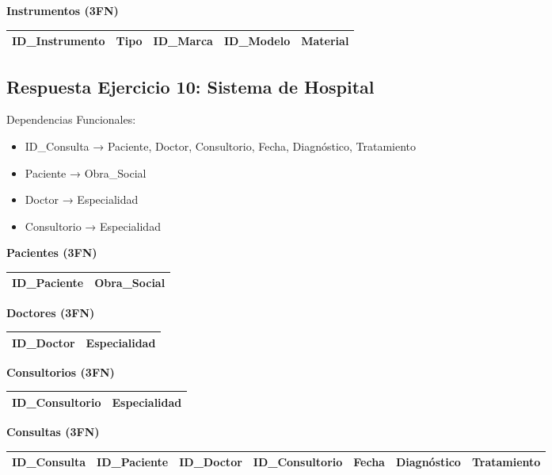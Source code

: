 \documentclass[12pt]{article}
\begin{document}
\textbf{Instrumentos (3FN)}
\begin{center}
\begin{tabular}{|l|l|l|l|l|}
\hline
ID\_Instrumento & Tipo & ID\_Marca & ID\_Modelo & Material \\
\hline
\end{tabular}
\end{center}

\subsection{Respuesta Ejercicio 10: Sistema de Hospital}

Dependencias Funcionales:
\begin{itemize}
    \item ID\_Consulta → Paciente, Doctor, Consultorio, Fecha, Diagnóstico, Tratamiento
    \item Paciente → Obra\_Social
    \item Doctor → Especialidad
    \item Consultorio → Especialidad
\end{itemize}

\textbf{Pacientes (3FN)}
\begin{center}
\begin{tabular}{|l|l|}
\hline
ID\_Paciente & Obra\_Social \\
\hline
\end{tabular}
\end{center}

\textbf{Doctores (3FN)}
\begin{center}
\begin{tabular}{|l|l|}
\hline
ID\_Doctor & Especialidad \\
\hline
\end{tabular}
\end{center}

\textbf{Consultorios (3FN)}
\begin{center}
\begin{tabular}{|l|l|}
\hline
ID\_Consultorio & Especialidad \\
\hline
\end{tabular}
\end{center}

\textbf{Consultas (3FN)}
{\small
\begin{center}
\begin{tabular}{|l|l|l|l|l|l|l|}
\hline
ID\_Consulta & ID\_Paciente & ID\_Doctor & ID\_Consultorio & Fecha & Diagnóstico & Tratamiento \\
\hline
\end{tabular}
\end{center}
}
\end{document}
